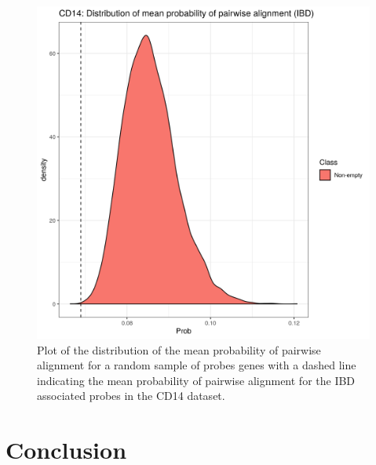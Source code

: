\documentclass[12pt]{article} %
\begin{document}
	\begin{figure}[h]
		\centering
		\includegraphics[scale=0.75]{Images/Biology_data/Set_1000/All_datasets//Mean_alignment_probability/CD14_KEGG_INFLAMMATORY_BOWEL_DISEASE.png}
		\caption{Plot of the distribution of the mean probability of pairwise alignment for a random sample of probes genes with a dashed line indicating the mean probability of pairwise alignment for the IBD associated probes in the CD14 dataset.}
		\label{fig:results:cedar_2:mdi_cd14_ibd_alignment_prob_distn}
	\end{figure}
	\newpage
	
	\section{Conclusion}
	
\end{document}
